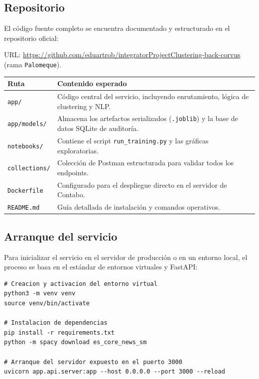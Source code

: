 

\subsection{Repositorio}

El código fuente completo se encuentra documentado y estructurado en el repositorio oficial:

URL: \url{https://github.com/eduartrob/integratorProjectClustering-back-corvus} (rama \texttt{Palomeque}).

\begin{tabular}{@{}lp{9.5cm}@{}}
  \toprule
  Ruta & Contenido esperado \\
  \midrule
  \texttt{app/} & Código central del servicio, incluyendo enrutamiento, lógica de clustering y NLP. \\
  \texttt{app/models/} & Almacena los artefactos serializados (\texttt{.joblib}) y la base de datos SQLite de auditoría. \\
  \texttt{notebooks/} & Contiene el script \texttt{run\_training.py} y las gráficas exploratorias. \\
  \texttt{collections/} & Colección de Postman estructurada para validar todos los endpoints. \\
  \texttt{Dockerfile} & Configurado para el despliegue directo en el servidor de Contabo. \\
  \texttt{README.md} & Guía detallada de instalación y comandos operativos. \\
  \bottomrule
\end{tabular}

\subsection{Arranque del servicio}

Para inicializar el servicio en el servidor de producción o en un entorno local, el proceso se basa en el estándar de entornos virtuales y FastAPI:

\begin{lstlisting}[style=bashstyle]
# Creacion y activacion del entorno virtual
python3 -m venv venv
source venv/bin/activate

# Instalacion de dependencias
pip install -r requirements.txt
python -m spacy download es_core_news_sm

# Arranque del servidor expuesto en el puerto 3000
uvicorn app.api.server:app --host 0.0.0.0 --port 3000 --reload
\end{lstlisting}

